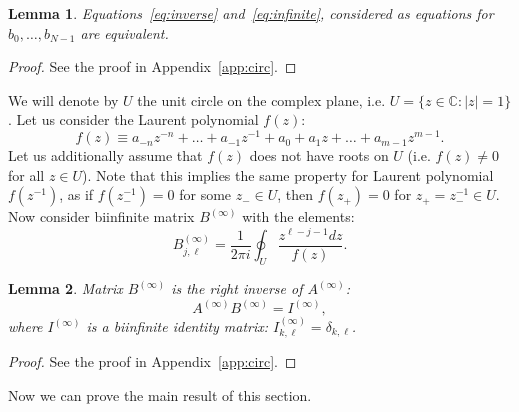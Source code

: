 \documentclass[a4paper]{article}
\newtheorem{lemma}{Lemma}[section]
\newcommand{\Binf}{B^{(\infty)}}
\newcommand{\Ainf}{A^{(\infty)}}
\begin{document}
	\begin{lemma}\label{lm:equivalent}
	Equations~\eqref{eq:inverse} and~\eqref{eq:infinite}, considered as equations for $b_0,\dots,b_{N-1}$ are equivalent.
	\end{lemma}
	\begin{proof}
	    See the proof in Appendix~\ref{app:circ}.
	\end{proof}
	
	We will denote by $U$ the unit circle on the complex plane, i.e. $U = \{z\in\mathbb{C}: |z| = 1\}$.
	Let us consider the Laurent polynomial $f(z)$:
	\begin{equation}\label{eq:laurent}
	f(z) \equiv a_{-n}z^{-n} + \dots + a_{-1}z^{-1} + a_0 + a_1 z + \dots +a_{m-1}z^{m-1}.
	\end{equation}
	Let us additionally assume that $f(z)$ does not have roots on $U$ (i.e. $f(z) \neq 0$ for all $z \in U$).
	Note that this implies the same property for Laurent polynomial $f(z^{-1})$, as if $f(z_-^{-1}) = 0$ for some $z_- \in U$, then $f(z_+) = 0$ for $z_+ = z^{-1}_- \in U$.
	Now consider biinfinite matrix $\Binf$ with the elements:
	\begin{equation}\label{eq:B}
	\Binf_{j,\ell} = \frac{1}{2\pi i} \oint_U \frac{z^{\ell - j-1}dz}{f(z)}.
	\end{equation}
	\begin{lemma} \label{lm:unnamed}
	Matrix $\Binf$ is the right inverse of $\Ainf$:
	\[
	\Ainf \Binf = I^{(\infty)},
	\]
	where $I^{(\infty)}$ is a biinfinite identity matrix: $I^{(\infty)}_{k,\ell} = \delta_{k,\ell}$.
	\end{lemma}
	\begin{proof}
	    See the proof in Appendix~\ref{app:circ}.
	\end{proof}
	Now we can prove the main result of this section.
\end{document}
